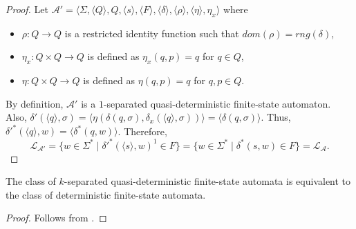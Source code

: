 \begin{proof}
  Let $\mathcal{A}' = \langle \Sigma, \langle
  Q \rangle, Q, \langle s \rangle, \langle F \rangle, \langle \delta \rangle,
  \langle \rho \rangle, \langle \eta \rangle, \eta_x \rangle$ where
  \begin{itemize}
    \item $\rho : Q \rightarrow Q$ is a restricted identity function such that
      $dom(\rho) = rng(\delta)$,
    \item $\eta_x : Q \times Q \rightarrow Q$ is defined as $\eta_x(q, p) = q$ for
      $q \in Q$,
    \item $\eta : Q \times Q \rightarrow Q$ is defined as $\eta(q, p) = q$ for $q, p
      \in Q$.
  \end{itemize}
  By definition, $\mathcal{A}'$ is a $1$-separated quasi-deterministic finite-state
  automaton. Also, $\delta'(\langle q \rangle, \sigma) = \langle \eta(\delta(q,
  \sigma), \delta_x(\langle q \rangle, \sigma)) \rangle = \langle \delta(q, \sigma)
  \rangle$. Thus, $\delta'^*(\langle q \rangle, w) = \langle \delta^*(q, w) \rangle$.
  Therefore,
  \begin{equation*}
    \mathcal{L}_\mathcal{A'} = \{ w \in \Sigma^* \mid \delta'^*(\langle s \rangle,
    w)^1 \in F \} = \{ w \in \Sigma^* \mid \delta^*(s, w) \in F \} =
    \mathcal{L}_\mathcal{A}.
  \end{equation*}
\end{proof}

\begin{theorem}
  The class of $k$-separated quasi-deterministic finite-state automata is equivalent
  to the class of deterministic finite-state automata.
\end{theorem}

\begin{proof}
  Follows from .
\end{proof}
